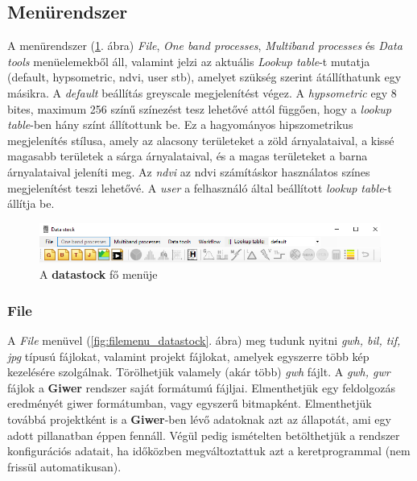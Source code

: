 \documentclass[a4paper,12pt]{article}
\begin{document}
\subsection{Menürendszer}

A menürendszer (\ref{fig:datastock_fomenu}. ábra) \textit{File}, \textit{One band processes}, \textit{Multiband processes} és \textit{Data tools} menüelemekből áll, valamint jelzi az aktuális \textit{Lookup table}-t mutatja (default, hypsometric, ndvi, user stb), amelyet szükség szerint átállíthatunk egy másikra. A \textit{default} beállítás greyscale megjelenítést végez. A \textit{hypsometric} egy 8 bites, maximum 256 színű színezést tesz lehetővé attól függően, hogy a \textit{lookup table}-ben hány színt állítottunk be. Ez a hagyományos hipszometrikus megjelenítés stílusa, amely az alacsony területeket a zöld árnyalataival, a kissé magasabb területek a sárga árnyalataival, és a magas területeket a barna árnyalataival jeleníti meg. Az \textit{ndvi} az ndvi számításkor használatos színes megjelenítést teszi lehetővé. A \textit{user} a felhasználó által beállított \textit{lookup table}-t állítja be.

\begin{figure}
	\centering
	\includegraphics[width=14cm]{datastock_fomenu.png}
	\caption{A \textbf{datastock} fő menüje}
	\label{fig:datastock_fomenu}
\end{figure}

\subsubsection{File}

A \textit{File} menüvel (\ref{fig:filemenu_datastock}. ábra) meg tudunk nyitni \textit{gwh, bil, tif, jpg} típusú fájlokat, valamint projekt fájlokat, amelyek egyszerre több kép kezelésére szolgálnak. Törölhetjük valamely (akár több) \textit{gwh} fájlt. A \textit{gwh, gwr} fájlok a \textbf{Giwer} rendszer saját formátumú fájljai. Elmenthetjük egy feldolgozás eredményét giwer formátumban, vagy egyszerű bitmapként. Elmenthetjük továbbá projektként is a \textbf{Giwer}-ben lévő adatoknak azt az állapotát, ami egy adott pillanatban éppen fennáll. Végül pedig ismételten betölthetjük a rendszer konfigurációs adatait, ha időközben megváltoztattuk azt a keretprogrammal (nem frissül automatikusan).
\end{document}
